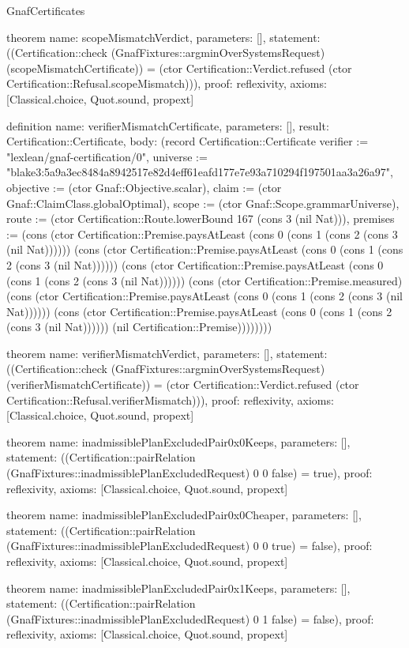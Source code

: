 \begin{lexlean}{GnafCertificates}
\begin{semanticmodule}
theorem{
  name: scopeMismatchVerdict,
  parameters: [],
  statement: ((Certification::check (GnafFixtures::argminOverSystemsRequest) (scopeMismatchCertificate)) = (ctor Certification::Verdict.refused (ctor Certification::Refusal.scopeMismatch))),
  proof: reflexivity{},
  axioms: [Classical.choice, Quot.sound, propext]
}

definition{
  name: verifierMismatchCertificate,
  parameters: [],
  result: Certification::Certificate,
  body: (record Certification::Certificate {verifier := "lexlean/gnaf-certification/0", universe := "blake3:5a9a3ec8484a8942517e82d4eff61eafd177e7e93a710294f197501aa3a26a97", objective := (ctor Gnaf::Objective.scalar), claim := (ctor Gnaf::ClaimClass.globalOptimal), scope := (ctor Gnaf::Scope.grammarUniverse), route := (ctor Certification::Route.lowerBound 167 (cons 3 (nil Nat))), premises := (cons (ctor Certification::Premise.paysAtLeast (cons 0 (cons 1 (cons 2 (cons 3 (nil Nat)))))) (cons (ctor Certification::Premise.paysAtLeast (cons 0 (cons 1 (cons 2 (cons 3 (nil Nat)))))) (cons (ctor Certification::Premise.paysAtLeast (cons 0 (cons 1 (cons 2 (cons 3 (nil Nat)))))) (cons (ctor Certification::Premise.measured) (cons (ctor Certification::Premise.paysAtLeast (cons 0 (cons 1 (cons 2 (cons 3 (nil Nat)))))) (cons (ctor Certification::Premise.paysAtLeast (cons 0 (cons 1 (cons 2 (cons 3 (nil Nat)))))) (nil Certification::Premise)))))))})
}

theorem{
  name: verifierMismatchVerdict,
  parameters: [],
  statement: ((Certification::check (GnafFixtures::argminOverSystemsRequest) (verifierMismatchCertificate)) = (ctor Certification::Verdict.refused (ctor Certification::Refusal.verifierMismatch))),
  proof: reflexivity{},
  axioms: [Classical.choice, Quot.sound, propext]
}

theorem{
  name: inadmissiblePlanExcludedPair0x0Keeps,
  parameters: [],
  statement: ((Certification::pairRelation (GnafFixtures::inadmissiblePlanExcludedRequest) 0 0 false) = true),
  proof: reflexivity{},
  axioms: [Classical.choice, Quot.sound, propext]
}

theorem{
  name: inadmissiblePlanExcludedPair0x0Cheaper,
  parameters: [],
  statement: ((Certification::pairRelation (GnafFixtures::inadmissiblePlanExcludedRequest) 0 0 true) = false),
  proof: reflexivity{},
  axioms: [Classical.choice, Quot.sound, propext]
}

theorem{
  name: inadmissiblePlanExcludedPair0x1Keeps,
  parameters: [],
  statement: ((Certification::pairRelation (GnafFixtures::inadmissiblePlanExcludedRequest) 0 1 false) = false),
  proof: reflexivity{},
  axioms: [Classical.choice, Quot.sound, propext]
}


\end{semanticmodule}
\end{lexlean}

